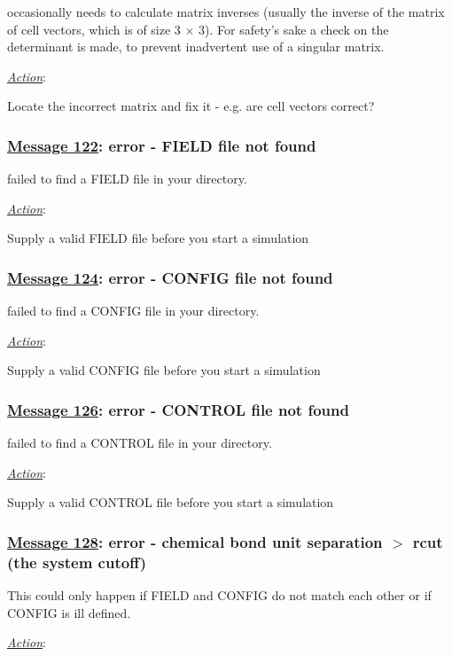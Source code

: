 \D occasionally needs to calculate matrix inverses (usually the
inverse of the matrix of cell vectors, which is of size 3 $\times$
3).  For safety's sake a check on the determinant is made, to
prevent inadvertent use of a singular matrix.

\noindent \underline{\em Action}:

Locate the incorrect matrix and fix it - e.g. are cell vectors
correct?

\subsubsection*{\underline{Message 122}: error - FIELD file not found}

\D failed to find a FIELD file in your directory.

\noindent \underline{\em Action}:

Supply a valid FIELD file before you start a simulation

\subsubsection*{\underline{Message 124}: error - CONFIG file not found}

\D failed to find a CONFIG file in your directory.

\noindent \underline{\em Action}:

Supply a valid CONFIG file before you start a simulation

\subsubsection*{\underline{Message 126}: error - CONTROL file not found}

\D failed to find a CONTROL file in your directory.

\noindent \underline{\em Action}:

Supply a valid CONTROL file before you start a simulation

\subsubsection*{\underline{Message 128}: error - chemical bond unit separation $>$ rcut (the system cutoff)}

This could only happen if FIELD and CONFIG do not match each other
or if CONFIG is ill defined.

\noindent \underline{\em Action}:

